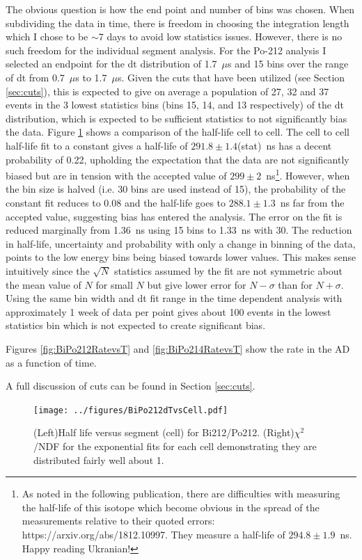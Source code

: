 The obvious question is how the end point and number of bins was chosen. When subdividing the data in time, there is freedom in choosing the integration length which I chose to be $\sim$7 days to avoid low statistics issues. However, there is no such freedom for the individual segment analysis. For the Po-212 analysis I selected an endpoint for the dt distribution of 1.7~$\mu$s and 15 bins over the range of dt from 0.7~$\mu$s to 1.7~$\mu$s. Given the cuts that have been utilized (see Section \ref{sec:cuts}), this is expected to give on average a population of 27, 32 and 37 events in the 3 lowest statistics bins (bins 15, 14, and 13 respectively) of the dt distribution, which is expected to be sufficient statistics to not significantly bias the data. Figure \ref{fig:Po212thalfvscell} shows a comparison of the half-life cell to cell. The cell to cell half-life fit to a constant gives a half-life of $291.8\pm1.4$(stat)~ns has a decent probability of 0.22, upholding the expectation that the data are not significantly biased but are in tension with the accepted value of $299\pm2$~ns\footnote{As noted in the following publication, there are difficulties with measuring the half-life of this isotope which become obvious in the spread of the measurements relative to their quoted errors: https://arxiv.org/abs/1812.10997. They measure a half-life of $294.8\pm1.9$~ns. Happy reading Ukranian!}. However, when the bin size is halved (i.e. 30 bins are used instead of 15), the probability of the constant fit reduces to 0.08 and the half-life goes to $288.1\pm1.3$~ns far from the accepted value, suggesting bias has entered the analysis. The error on the fit is reduced marginally from 1.36~ns using 15 bins to 1.33~ns with 30. The reduction in half-life, uncertainty and probability with only a change in binning of the data, points to the low energy bins being biased towards lower values. This makes sense intuitively since the $\sqrt{N}$ statistics assumed by the fit are not symmetric about the mean value of $N$ for small $N$ but give lower error for $N-\sigma$ than for $N+\sigma$. Using the same bin width and dt fit range in the time dependent analysis with approximately 1 week of data per point gives about 100 events in the lowest statistics bin which is not expected to create significant bias. 

Figures \ref{fig:BiPo212RatevsT} and \ref{fig:BiPo214RatevsT} show the rate in the AD as a function of time.

A full discussion of cuts can be found in Section \ref{sec:cuts}.
\begin{figure}[!h]
	\centering
	\texttt{[image: ../figures/BiPo212dTvsCell.pdf]}
	\caption{\label{fig:Po212thalfvscell}(Left)Half life versus segment (cell) for Bi212/Po212. (Right)$\chi^2$/NDF for the exponential fits for each cell demonstrating they are distributed fairly well about 1.}
\end{figure}

